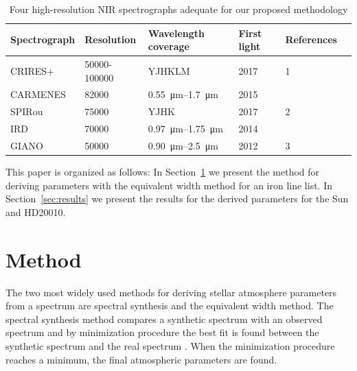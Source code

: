 \documentclass{aa}
\begin{document}
\begin{table}[tb!]
    \caption{Four high-resolution NIR spectrographs adequate for our proposed
        methodology}
    \label{tab:spectrograph}
    \centering
    \begin{tabular}{llllll}
      \hline\hline
        Spectrograph & Resolution   & Wavelength coverage               & First light & References \\
      \hline
        CRIRES+      & 50000-100000 & YJHKLM                            & 2017        & 1 \\
        CARMENES     & 82000        & \SIrange{0.55}{1.7}{\micro\meter} & 2015        & \cite{CARMENES} \\
        SPIRou       & 75000        & YJHK                              & 2017        & 2 \\
        IRD          & 70000        & \SIrange{0.97}{1.75}{\micro\meter}& 2014        & \cite{IRD} \\
        GIANO        & 50000        & \SIrange{0.90}{2.5}{\micro\meter} & 2012        & 3 \\
      \hline
    \end{tabular}
\end{table}

This paper is organized as follows: In Section~\ref{sec:method} we
present the method for deriving parameters with the equivalent width
method for an iron line list. In Section~\ref{sec:results} we present
the results for the derived parameters for the Sun and HD20010.





\section{Method}
\label{sec:method}

The two most widely used methods for deriving stellar atmosphere
parameters from a spectrum are spectral synthesis and the equivalent
width method. The spectral synthesis method compares a synthetic
spectrum with an observed spectrum and by minimization procedure the
best fit is found between the synthetic spectrum and the real spectrum
\citep[see e.g.][]{Onehag2012}. When the minimization procedure reaches
a minimum, the final atmospheric parameters are found.
\end{document}
